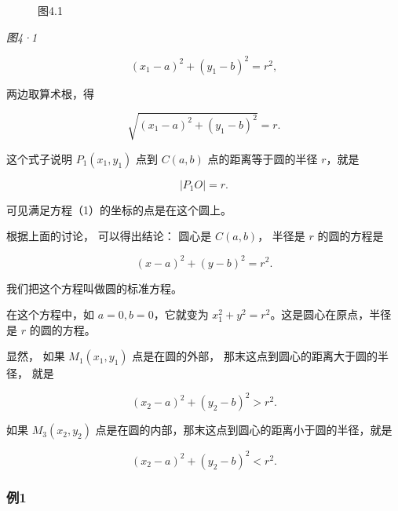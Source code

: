 \begin{figure}
\centering
{}
\caption{图4.1}
\end{figure}

\emph{图4·1}

\[
(x_{1} - a) ^ {2} + (y_{1} - b) ^ {2} = r^{2},
\]

两边取算术根，得

\[
\sqrt {(x_{1} - a) ^ {2} + (y_{1} - b) ^ {2}} = r.
\]

这个式子说明 \(P_{1}(x_{1},y_{1})\) 点到 \(C(a,b)\) 点的距离等于圆的半径
\(r\)，就是

\[
\left| P_{1} O \right| = r.
\]

可见满足方程（1）的坐标的点是在这个圆上。

根据上面的讨论， 可以得出结论： 圆心是 \(C(a, b)\)， 半径是 \(r\)
的圆的方程是

\[
(x - a) ^ {2} + (y - b) ^ {2} = r^{2}.
\]

我们把这个方程叫做圆的标准方程。

在这个方程中，如 \(a = 0, b = 0\)，它就变为
\(x_{1}^{2} + y^{2} = r^{2}\)。这是圆心在原点，半径是 \(r\) 的圆的方程。

显然， 如果 \(M_{1}(x_{1}, y_{1})\) 点是在圆的外部，
那末这点到圆心的距离大于圆的半径， 就是

\[
(x_{2} - a) ^ {2} + (y_{2} - b) ^ {2} > r^{2}.
\]

如果 \(M_{3}(x_{2},y_{2})\)
点是在圆的内部，那末这点到圆心的距离小于圆的半径，就是

\[
(x_{2} - a) ^ {2} + (y_{2} - b) ^ {2} < r^{2}.
\]

\subsubsection{例1}\label{ux4f8b1-21}


